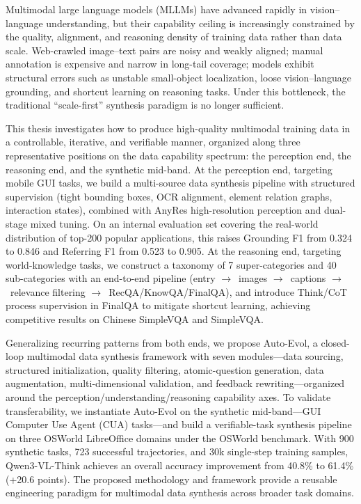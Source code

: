 \documentclass[type=master, twoside]{fduthesis}
\begin{document}
\begin{abstract*}

Multimodal large language models (MLLMs) have advanced rapidly in vision--language understanding, but their capability ceiling is increasingly constrained by the quality, alignment, and reasoning density of training data rather than data scale. Web-crawled image--text pairs are noisy and weakly aligned; manual annotation is expensive and narrow in long-tail coverage; models exhibit structural errors such as unstable small-object localization, loose vision--language grounding, and shortcut learning on reasoning tasks. Under this bottleneck, the traditional ``scale-first'' synthesis paradigm is no longer sufficient.

This thesis investigates how to produce high-quality multimodal training data in a controllable, iterative, and verifiable manner, organized along three representative positions on the data capability spectrum: the perception end, the reasoning end, and the synthetic mid-band. At the perception end, targeting mobile GUI tasks, we build a multi-source data synthesis pipeline with structured supervision (tight bounding boxes, OCR alignment, element relation graphs, interaction states), combined with AnyRes high-resolution perception and dual-stage mixed tuning. On an internal evaluation set covering the real-world distribution of top-200 popular applications, this raises Grounding F1 from 0.324 to 0.846 and Referring F1 from 0.523 to 0.905. At the reasoning end, targeting world-knowledge tasks, we construct a taxonomy of 7 super-categories and 40 sub-categories with an end-to-end pipeline (entry $\rightarrow$\allowbreak\ images $\rightarrow$\allowbreak\ captions $\rightarrow$\allowbreak\ relevance filtering $\rightarrow$\allowbreak\ RecQA/\allowbreak KnowQA/\allowbreak FinalQA), and introduce Think/CoT process supervision in FinalQA to mitigate shortcut learning, achieving competitive results on Chinese SimpleVQA and SimpleVQA.

Generalizing recurring patterns from both ends, we propose Auto-Evol, a closed-loop multimodal data synthesis framework with seven modules---data sourcing, structured initialization, quality filtering, atomic-question generation, data augmentation, multi-dimensional validation, and feedback rewriting---organized around the perception/\allowbreak understanding/\allowbreak reasoning capability axes. To validate transferability, we instantiate Auto-Evol on the synthetic mid-band---GUI Computer Use Agent (CUA) tasks---and build a verifiable-task synthesis pipeline on three OSWorld LibreOffice domains under the OSWorld benchmark. With 900 synthetic tasks, 723 successful trajectories, and 30k single-step training samples, Qwen3-VL-Think achieves an overall accuracy improvement from 40.8\% to 61.4\% (+20.6 points). The proposed methodology and framework provide a reusable engineering paradigm for multimodal data synthesis across broader task domains.


\end{abstract*}
\end{document}
